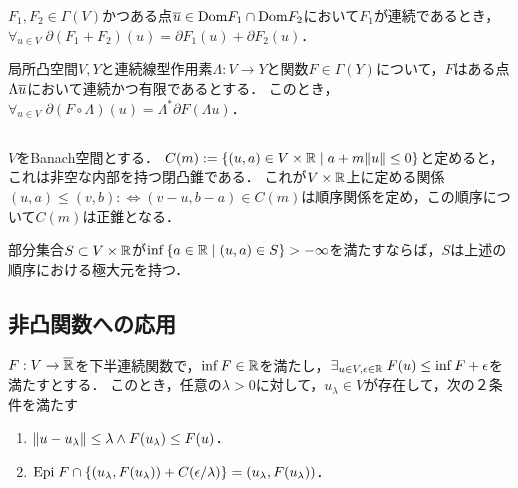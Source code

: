 \documentclass[uplatex,dvipdfmx]{jsreport}
\begin{document}
\begin{proposition}[等号成立十分条件]
    $F_1,F_2\in\Gamma(V)$かつある点$\overline{u}\in\mathrm{Dom} F_1\cap\mathrm{Dom} F_2$において$F_1$が連続であるとき，$\forall_{u\in V}\;\partial(F_1+F_2)(u)=\partial F_1(u)+\partial F_2(u)$．
\end{proposition}

\begin{proposition}
    局所凸空間$V,Y$と連続線型作用素$\Lambda:V\to Y$と関数$F\in\Gamma(Y)$について，$F$はある点$\Lambda\overline{u}$において連続かつ有限であるとする．
    このとき，$\forall_{u\in V}\;\partial(F\circ\Lambda)(u)=\Lambda^*\partial F(\Lambda u)$．
\end{proposition}

\subsection{}

\begin{notation}
    $V$をBanach空間とする．
    $C(m):=\left\{(u,a)\in V\times\mathbb{R}\mid a+m\|u\|\le 0\right\}$と定めると，これは非空な内部を持つ閉凸錐である．
    これが$V\times\mathbb{R}$上に定める関係$(u,a)\le(v,b):\Leftrightarrow(v-u,b-a)\in C(m)$は順序関係を定め，この順序について$C(m)$は正錐となる．
\end{notation}

\begin{proposition}
    部分集合$S\subset V\times\mathbb{R}$が$\inf\left\{a\in\mathbb{R}\mid(u,a)\in S\right\}>-\infty$を満たすならば，$S$は上述の順序における極大元を持つ．
\end{proposition}

\subsection{非凸関数への応用}

\begin{theorem}
    $F:V\to\overline{\mathbb{R}}$を下半連続関数で，$\inf F\in\mathbb{R}$を満たし，$\exists_{u\in V,\epsilon\in\mathbb{R}}\;F(u)\le\inf F+\epsilon$を満たすとする．
    このとき，任意の$\lambda>0$に対して，$u_\lambda\in V$が存在して，次の２条件を満たす
    \begin{enumerate}
        \item $\|u-u_\lambda\|\le\lambda\land F(u_\lambda)\le F(u)$．
        \item $\mathrm{Epi}\; F\cap\left\{(u_\lambda,F(u_\lambda))+C(\epsilon/\lambda)\right\}=(u_\lambda,F(u_\lambda))$．
    \end{enumerate}
\end{theorem}
\end{document}
